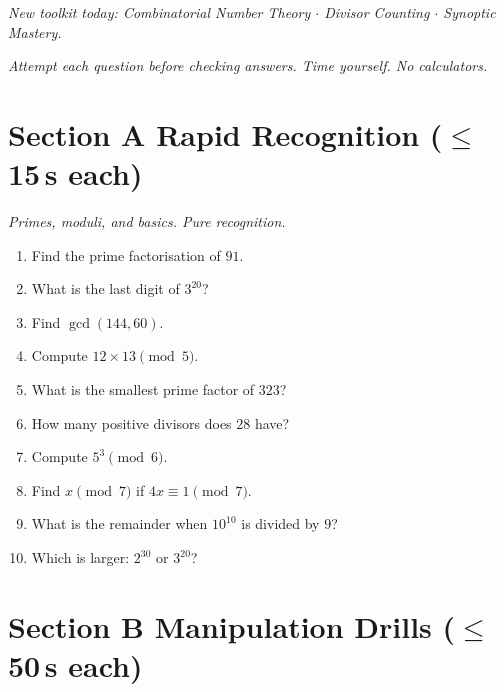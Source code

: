 \documentclass[11pt,a4paper]{article}
\begin{document}
\noindent\textit{New toolkit today: Combinatorial Number Theory $\cdot$ Divisor Counting $\cdot$ Synoptic Mastery.}

\vspace{2pt}
\noindent\textit{Attempt each question before checking answers. Time yourself. No calculators.}

\section*{Section A \quad Rapid Recognition \hfill{\normalfont\small($\leq$15\,s each)}}

\noindent\textit{Primes, moduli, and basics. Pure recognition.}

\begin{enumerate}

\item Find the prime factorisation of $91$.

\item What is the last digit of $3^{20}$?

\item Find $\gcd(144, 60)$.

\item Compute $12 \times 13 \pmod{5}$.

\item What is the smallest prime factor of $323$?

\item How many positive divisors does $28$ have?

\item Compute $5^{3} \pmod{6}$.

\item Find $x \pmod{7}$ if $4x \equiv 1 \pmod{7}$.

\item What is the remainder when $10^{10}$ is divided by $9$?

\item Which is larger: $2^{30}$ or $3^{20}$?

\end{enumerate}

\section*{Section B \quad Manipulation Drills \hfill{\normalfont\small($\leq$50\,s each)}}
\end{document}
